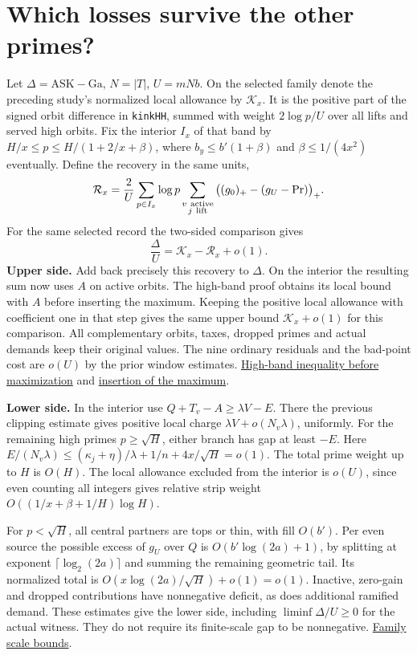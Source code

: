 \documentclass[12pt,letterpaper]{article}
\newcommand{\orig}[3]{\href{https://github.com/nousentllc/riemann-hypothesis/blob/40e56bab026552e089d7afcfeff08d2defb9c005/src/#1.lean\#L#2}{#3}}
\newcommand{\pagepart}[1]{\clearpage\section{#1}}
\begin{document}
\pagepart{Which losses survive the other primes?}
Let \(\Delta=\mathrm{ASK}-\mathrm{Ga}\), \(N=|T|\), \(U=mNb\). On the selected family denote the preceding study's normalized local allowance by \(\mathcal K_x\). It is the positive part of the signed orbit difference in \texttt{kinkHH}, summed with weight \(2\log p/U\) over all lifts and served high orbits. Fix the interior \(I_x\) of that band by \(H/x\le p\le H/(1+2/x+\beta)\), where \(b_y\le b'(1+\beta)\) and \(\beta\le1/(4x^2)\) eventually. Define the recovery in the same units,
\[
 \mathcal R_x=\frac2U\sum_{p\in I_x}\log p
       \sum_{\substack{v\ {\rm active}\\j\ {\rm lift}}}
                 \big((g_0)_+-(g_U-\mathrm{Pr})\big)_+ .
\]
For the same selected record the two-sided comparison gives
\[
                 \boxed{\displaystyle\frac{\Delta}{U}
                           =\mathcal K_x-\mathcal R_x+o(1).}
\]
\textbf{Upper side.} Add back precisely this recovery to \(\Delta\). On the interior the resulting sum now uses \(A\) on active orbits. The high-band proof obtains its local bound with \(A\) before inserting the maximum. Keeping the positive local allowance with coefficient one in that step gives the same upper bound \(\mathcal K_x+o(1)\) for this comparison. All complementary orbits, taxes, dropped primes and actual demands keep their original values. The nine ordinary residuals and the bad-point cost are \(o(U)\) by the prior window estimates.
\orig{Formalism/SharpRestriction/GrowthBounds/LogarithmicSums/PartnerCountOfCentral}{837}{High-band inequality before maximization} and
\orig{Formalism/SharpRestriction/GrowthBounds/LogarithmicSums/NotSingularOfCentral}{691}{insertion of the maximum}.

\textbf{Lower side.} In the interior use \(Q+T_v-A\ge\lambda V-E\). There the previous clipping estimate gives positive local charge \(\lambda V+o(N_v\lambda)\), uniformly. For the remaining high primes \(p\ge\sqrt H\), either branch has gap at least \(-E\). Here \(E/(N_v\lambda)\le(\kappa_j+\eta)/\lambda+1/n+4x/\sqrt H=o(1)\). The total prime weight up to \(H\) is \(O(H)\). The local allowance excluded from the interior is \(o(U)\), since even counting all integers gives relative strip weight \(O((1/x+\beta+1/H)\log H)\).

For \(p<\sqrt H\), all central partners are tops or thin, with fill \(O(b')\). Per even source the possible excess of \(g_U\) over \(Q\) is \(O(b'\log(2a)+1)\), by splitting at exponent \(\lceil\log_2(2a)\rceil\) and summing the remaining geometric tail. Its normalized total is \(O(x\log(2a)/\sqrt H)+o(1)=o(1)\). Inactive, zero-gain and dropped contributions have nonnegative deficit, as does additional ramified demand. These estimates give the lower side, including \(\liminf\Delta/U\ge0\) for the actual witness. They do not require its finite-scale gap to be nonnegative. \orig{Formalism/SizeWindowBrackets/WindowSettingSatisfiable}{95}{Family scale bounds}.
\end{document}
